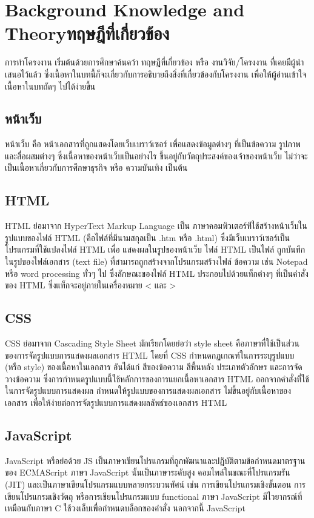 \chapter{\ifenglish Background Knowledge and Theory\else ทฤษฎีที่เกี่ยวข้อง\fi}

การทำโครงงาน เริ่มต้นด้วยการศึกษาค้นคว้า ทฤษฎีที่เกี่ยวข้อง หรือ งานวิจัย/โครงงาน ที่เคยมีผู้นำเสนอไว้แล้ว ซึ่งเนื้อหาในบทนี้ก็จะเกี่ยวกับการอธิบายถึงสิ่งที่เกี่ยวข้องกับโครงงาน เพื่อให้ผู้อ่านเข้าใจเนื้อหาในบทถัดๆ ไปได้ง่ายขึ้น

\section{หน้าเว็บ}
หน้าเว็บ คือ หน้าเอกสารที่ถูกแสดงโดยเว็บเบราว์เซอร์ เพื่อแสดงข้อมูลต่างๆ ที่เป็นข้อความ รูปภาพ และสื่อผสมต่างๆ ซึ่งเนื้อหาของหน้าเว็บเป็นอย่างไร ขึ้นอยู่กับวัตถุประสงค์ของเจ้าของหน้าเว็บ ไม่ว่าจะเป็นเนื้อหาเกี่ยวกับการศึกษาธุรกิจ หรือ ความบันเทิง เป็นต้น


\section{HTML}
HTML ย่อมาจาก HyperText Markup Language เป็น ภาษาคอมพิวเตอร์ท่ีใช้สร้างหน้าเว็บในรูปแบบของไฟล์ HTML (คือไฟล์ที่มีนามสกุลเป็น .htm หรือ .html) ซึ่งมีเว็บเบราว์เซอร์เป็นโปรแกรมที่ใช้แปลงไฟล์ HTML เพื่อ แสดงผลในรูปของหน้าเว็บ
ไฟล์ HTML เป็นไฟล์ ถูกบันทึกในรูปของไฟล์เอกสาร (text file) ที่สามารถถูกสร้างจากโปรแกรมสร้างไฟล์ ข้อความ เช่น Notepad หรือ word processing ทั่วๆ ไป ซึ่งลักษณะของไฟล์ HTML ประกอบไปด้วยแท็กต่างๆ ที่เป็นคำสั่งของ HTML ซึ่งแท็กจะอยู่ภายในเครื่องหมาย < และ >

\section{CSS}
CSS ย่อมาจาก Cascading Style Sheet  มักเรียกโดยย่อว่า style sheet คือภาษาที่ใช้เป็นส่วนของการจัดรูปแบบการแสดงผลเอกสาร  HTML โดยที่ CSS กำหนดกฏเกณฑ์ในการระบุรูปแบบ (หรือ style) ของเนื้อหาในเอกสาร 
อันได้แก่ สีของข้อความ สีพื้นหลัง ประเภทตัวอักษร และการจัดวางข้อความ ซึ่งการกำหนดรูปแบบนี้ใช้หลักการของการแยกเนื้อหาเอกสาร HTML ออกจากคำสั่งที่ใช้ในการจัดรูปแบบการแสดงผล กำหนดให้รูปแบบของการแสดงผลเอกสาร 
ไม่ขึ้นอยู่กับเนื้อหาของเอกสาร เพื่อให้ง่ายต่อการจัดรูปแบบการแสดงผลลัพธ์ของเอกสาร HTML

\section{JavaScript}
JavaScript หรือย่อด้วย JS เป็นภาษาเขียนโปรแกรมที่ถูกพัฒนาและปฏิบัติตามข้อกำหนดมาตรฐานของ ECMAScript
ภาษา JavaScript นั้นเป็นภาษาระดับสูง คอมไพล์ในขณะที่โปรแกรมรัน (JIT) และเป็นภาษาเขียนโปรแกรมแบบหลายกระบวนทัศน์ เช่น การเขียนโปรแกรมเชิงขั้นตอน การเขียนโปรแกรมเชิงวัตถุ หรือการเขียนโปรแกรมแบบ functional 
ภาษา JavaScript มีไวยากรณ์ที่เหมือนกับภาษา C ใช้วงเล็บเพื่อกำหนดบล็อกของคำสั่ง นอกจากนี้ JavaScript 

